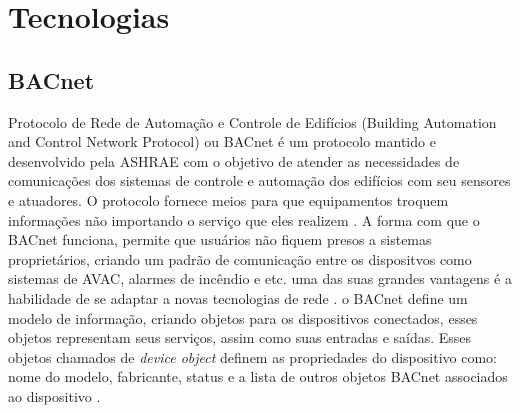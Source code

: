 \chapter{Tecnologias}
\label{tecnologias}

\section{BACnet}
Protocolo de Rede de Automação e Controle de Edifícios (Building Automation and Control Network Protocol) ou BACnet é um protocolo mantido e desenvolvido pela ASHRAE com o objetivo de atender as necessidades de comunicações dos sistemas de controle e automação dos edifícios com seu sensores e atuadores. O protocolo fornece meios para que equipamentos troquem informações não importando o serviço que eles realizem \cite{ASHRAE135}. A forma com que o BACnet funciona, permite que usuários não fiquem presos a sistemas proprietários, criando um padrão de comunicação entre os dispositvos como sistemas de AVAC, alarmes de incêndio e etc. uma das suas grandes vantagens é a habilidade de se adaptar a novas tecnologias de rede \cite{Bushby2002}.
o BACnet define um modelo de informação, criando objetos para os dispositivos conectados, esses objetos representam seus serviços, assim como suas entradas e saídas. Esses objetos chamados de \emph{device object} definem as propriedades do dispositivo como: nome do modelo, fabricante, status e a lista de outros objetos BACnet associados ao dispositivo \cite{Domingues2016}.

